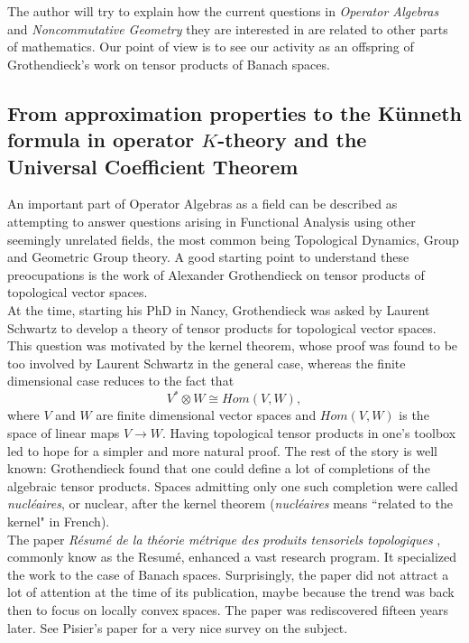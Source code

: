  The author will try to explain how the current questions in \textit{Operator Algebras} and \textit{Noncommutative Geometry} they are interested in are related to other parts of mathematics. Our point of view is to see our activity as an offspring of Grothendieck's work on tensor products of Banach spaces.    

\subsection{From approximation properties to the K\"unneth formula in operator $K$-theory and the Universal Coefficient Theorem}

An important part of Operator Algebras as a field can be described as attempting to answer questions arising in Functional Analysis using other seemingly unrelated fields, the most common being Topological Dynamics, Group and Geometric Group theory. A good starting point to understand these preocupations is the work of Alexander Grothendieck on tensor products of topological vector spaces. \\

At the time, starting his PhD in Nancy, Grothendieck was asked by Laurent Schwartz to develop a theory of tensor products for topological vector spaces. This question was motivated by the kernel theorem, whose proof was found to be too involved by Laurent Schwartz in the general case, whereas the finite dimensional case reduces to the fact that 
\[V^*\otimes W \cong Hom(V,W),\] 
where $V$ and $W$ are finite dimensional vector spaces and $Hom(V,W)$ is the space of linear maps $V\rightarrow W$. Having topological tensor products in one's toolbox led to hope for a simpler and more natural proof. The rest of the story is well known: Grothendieck found that one could define a lot of completions of the algebraic tensor products. Spaces admitting only one such completion were called \textit{nucl\'eaires}, or nuclear, after the kernel theorem (\textit{nucl\'eaires} means ``related to the kernel" in French).\\

The paper \textit{R\'esum\'e de la th\'eorie m\'etrique des produits tensoriels topologiques} \cite{GrothendieckResume}, commonly know as the Resum\'e, enhanced a vast research program. It specialized the work to the case of Banach spaces. Surprisingly, the paper did not attract a lot of attention at the time of its publication, maybe because the trend was back then to focus on locally convex spaces. The paper was rediscovered fifteen years later. See Pisier's paper \cite{PisierSurvey} for a very nice survey on the subject.\\

